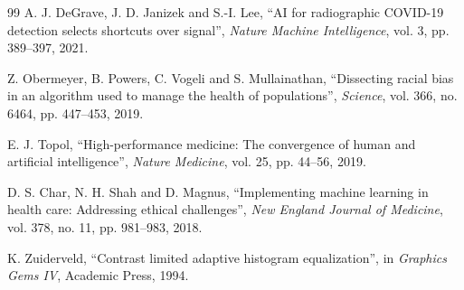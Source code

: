\documentclass[11pt,a4paper]{article}
\begin{document}
\begin{thebibliography}{99}
A. J. DeGrave, J. D. Janizek and S.-I. Lee, ``AI for radiographic COVID-19 detection selects shortcuts over signal'', \emph{Nature Machine Intelligence}, vol. 3, pp. 389--397, 2021.

Z. Obermeyer, B. Powers, C. Vogeli and S. Mullainathan, ``Dissecting racial bias in an algorithm used to manage the health of populations'', \emph{Science}, vol. 366, no. 6464, pp. 447--453, 2019.

E. J. Topol, ``High-performance medicine: The convergence of human and artificial intelligence'', \emph{Nature Medicine}, vol. 25, pp. 44--56, 2019.

D. S. Char, N. H. Shah and D. Magnus, ``Implementing machine learning in health care: Addressing ethical challenges'', \emph{New England Journal of Medicine}, vol. 378, no. 11, pp. 981--983, 2018.

K. Zuiderveld, ``Contrast limited adaptive histogram equalization'', in \emph{Graphics Gems IV}, Academic Press, 1994.

\end{thebibliography}
\end{document}
